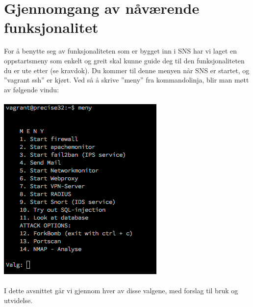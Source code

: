 \documentclass{article}
\begin{document}
\section{Gjennomgang av nåværende funksjonalitet}
For å benytte seg av funksjonaliteten som er bygget inn i SNS har vi laget en oppstartsmeny som enkelt og greit skal kunne guide deg til den funksjonaliteten du er ute etter (se kravdok). Du kommer til denne menyen når SNS er startet, og ''vagrant ssh'' er kjørt. Ved så å skrive ''meny'' fra kommandolinja, blir man møtt av følgende vindu: 
\\ \\
\includegraphics[scale=0.8]{pictures/meny.png} 
\\ \\
I dette avsnittet går vi gjennom hver av disse valgene, med forslag til bruk og utvidelse. 
\end{document}
